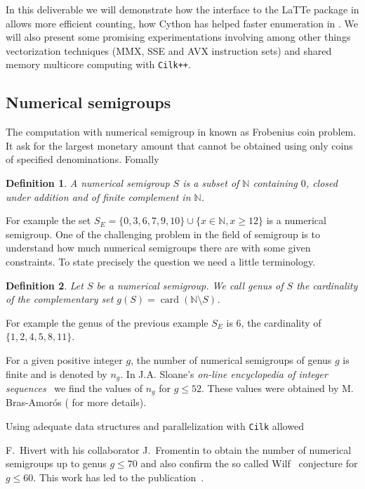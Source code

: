 \documentclass{deliverablereport}
\newcommand{\Cilk}{\texttt{Cilk}\xspace}
\newcommand{\CilkP}{\texttt{Cilk++}\xspace}
\newcommand{\NN}{\mathbb{N}}
\newtheorem{defi}{Definition}
\begin{document}
In this deliverable we will demonstrate how the interface to the LaTTe package
in \Sage allows more efficient counting, how Cython has helped faster enumeration
in \Sage. We will also present some promising experimentations involving among
other things vectorization techniques (MMX, SSE and AVX instruction sets) and
shared memory multicore computing with \CilkP.

\subsection{Numerical semigroups}

The computation with numerical semigroup in known as Frobenius coin
problem. It ask for the largest monetary amount that cannot be obtained using
only coins of specified denominations. Fomally
\begin{defi}
  A \emph{numerical semigroup} $S$ is a subset of $\NN$ containing $0$, closed
  under addition and of finite complement in $\NN$.
\end{defi}
For example the set $S_E=\{0,3,6,7,9,10\}\cup\{x\in\NN, x\geq 12\}$
is a numerical semigroup. One of the challenging problem in the field of
semigroup is to understand how much numerical semigroups there are with some
given constraints. To state precisely the question we need a little
terminology.
\begin{defi}
  Let $S$ be a numerical semigroup. We call \emph{genus} of $S$ the
  cardinality of the complementary set $g(S)=\operatorname{card}(\NN\setminus
  S)$.
\end{defi}
For example the genus of the previous example $S_E$ is $6$, the cardinality of
$\{1,2,4,5,8,11\}$.

For a given positive integer $g$, the number of numerical semigroups of genus
$g$ is finite and is denoted by $n_g$. In J.A. Sloane's \emph{on-line
encyclopedia of integer sequences}~\cite{OEIS} we find the values of $n_g$
for $g\leq 52$. These values were obtained by M. Bras-Amor\'os
(\cite{BrasAmoros2008} for more details). 

Using adequate data structures and parallelization with \Cilk allowed

F.~Hivert with his collaborator J.~Fromentin to obtain the number of numerical
semigroups up to genus $g \leq 70$ and also confirm the so called
Wilf~\cite{Wilf} conjecture for $g \leq 60$. This work has led to the
publication~\cite{FromentinH16}.
\end{document}
